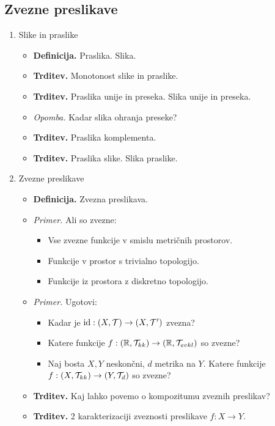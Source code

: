 \subsection{Zvezne preslikave}
\begin{enumerate}
    \item Slike in praslike
    \begin{itemize}
        \item \colorbox{purple!30}{\textbf{Definicija.}} Praslika. Slika.
        \item \colorbox{blue!30}{\textbf{Trditev.}} Monotonost slike in praslike.
        \item \colorbox{blue!30}{\textbf{Trditev.}} Praslika unije in preseka. Slika unije in preseka.
        \item \colorbox{yellow!30}{\emph{Opomba.}} Kadar slika ohranja preseke?
        \item \colorbox{blue!30}{\textbf{Trditev.}} Praslika komplementa.
        \item \colorbox{blue!30}{\textbf{Trditev.}} Praslika slike. Slika praslike.
    \end{itemize}

    \item Zvezne preslikave
    \begin{itemize}
        \item \colorbox{purple!30}{\textbf{Definicija.}} Zvezna preslikava.
        \item \colorbox{yellow!30}{\emph{Primer.}} Ali so zvezne:
        \begin{itemize}
            \item Vse zvezne funkcije v smislu metričnih prostorov.
            \item Funkcije v prostor s trivialno topologijo.
            \item Funkcije iz prostora z diskretno topologijo.          
        \end{itemize}
        \item \colorbox{yellow!30}{\emph{Primer.}} Ugotovi:
        \begin{itemize}
            \item Kadar je $\operatorname{id}: (X, \mathcal{T}) \to (X, \mathcal{T}')$ zvezna?
            \item Katere funkcije $f: (\mathbb{R}, \mathcal{T}_{kk}) \to (\mathbb{R}, \mathcal{T}_{evkl})$ so zvezne?
            \item Naj bosta $X, Y$ neskončni, $d$ metrika na $Y$. Katere funkcije $f: (X, \mathcal{T}_{kk}) \to (Y, \mathcal{T}_{d})$ so zvezne?
        \end{itemize}
        \item \colorbox{blue!30}{\textbf{Trditev.}} Kaj lahko povemo o kompozitumu zveznih preslikav?
        \item \colorbox{blue!30}{\textbf{Trditev.}} 2 karakterizaciji zveznosti preslikave $f: X \to Y$.
    \end{itemize}
\end{enumerate}

